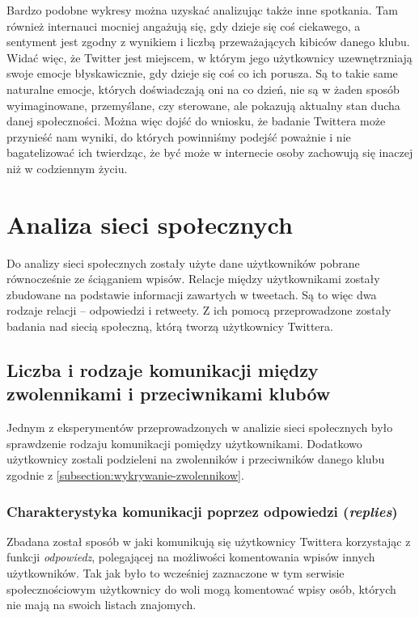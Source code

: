 Bardzo podobne wykresy można uzyskać analizując także inne spotkania.
Tam również internauci mocniej angażują się, gdy dzieje się coś ciekawego, a
sentyment jest zgodny z wynikiem i liczbą przeważających kibiców danego klubu.
Widać więc, że Twitter jest miejscem, w którym jego użytkownicy uzewnętrzniają
swoje emocje błyskawicznie, gdy dzieje się coś co ich porusza.
Są to takie same naturalne emocje, których doświadczają oni na co dzień, nie są
w żaden sposób wyimaginowane, przemyślane, czy sterowane, ale pokazują aktualny
stan ducha danej społeczności. Można więc dojść do wniosku, że badanie Twittera
może przynieść nam wyniki, do których powinniśmy podejść poważnie i nie
bagatelizować ich twierdząc, że być może w internecie osoby zachowują się
inaczej niż w codziennym życiu.





\section{Analiza sieci społecznych}
\label{section:analizaspoleczna}
Do analizy sieci społecznych zostały użyte dane użytkowników pobrane 
równocześnie ze ściąganiem wpisów. Relacje między użytkownikami zostały
zbudowane na podstawie informacji zawartych w tweetach. Są to więc
dwa rodzaje relacji -- odpowiedzi i retweety. Z ich pomocą przeprowadzone
zostały badania nad siecią społeczną, którą tworzą użytkownicy Twittera. 






\subsection{Liczba i rodzaje komunikacji między zwolennikami i przeciwnikami klubów}
\label{subsection:rodzajekomunikacji}

Jednym z eksperymentów przeprowadzonych w analizie sieci społecznych było
sprawdzenie rodzaju komunikacji pomiędzy użytkownikami. 
Dodatkowo użytkownicy zostali podzieleni na zwolenników i przeciwników danego 
klubu zgodnie z \ref{subsection:wykrywanie-zwolennikow}.


\subsubsection{Charakterystyka komunikacji poprzez odpowiedzi (\textit{replies})}
Zbadana został sposób w jaki komunikują się użytkownicy Twittera korzystając
z funkcji \textit{odpowiedz}, polegającej na możliwości komentowania wpisów
innych użytkowników. Tak jak było to wcześniej zaznaczone w tym serwisie
społecznościowym użytkownicy do woli mogą komentować wpisy osób, których
nie mają na swoich listach znajomych.

